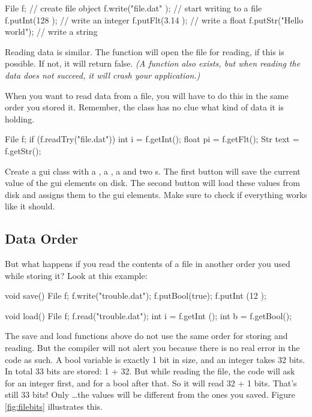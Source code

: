 \begin{code}
File f;                  // create file object
f.write("file.dat"    ); // start writing to a file
f.putInt(128          ); // write an integer
f.putFlt(3.14         ); // write a float
f.putStr("Hello world"); // write a string
\end{code}

Reading data is similar. The function  will open the file for reading, if this is possible. If not, it will return false. \textsl{(A function  also exists, but when reading the data does not succeed, it will crash your application.)}

When you want to read data from a file, you will have to do this in the same order you stored it. Remember, the class  has no clue what kind of data it is holding. 

\begin{code}
File f;
if (f.readTry("file.dat")) {
	int   i    = f.getInt();
	float pi   = f.getFlt();
	Str   text = f.getStr();
}
\end{code}

\begin{exercise}
Create a gui class with a , a , a  and two s. The first button will save the current value of the gui elements on disk. The second button will load these values from disk and assigns them to the gui elements. Make sure to check if everything works like it should.
\end{exercise}

\subsection{Data Order}
But what happens if you read the contents of a file in another order you used while storing it? Look at this example:

\begin{code}
void save() {
  File f;
	f.write("trouble.dat");
	f.putBool(true);
	f.putInt (12  );
}

void load() {
  File f;
	f.read("trouble.dat");
	int i = f.getInt ();
	int b = f.getBool();
}
\end{code}

The save and load functions above do not use the same order for storing and reading. But the compiler will not alert you because there is no real error in the code as such. A bool variable is exactly 1 bit in size, and an integer takes 32 bits. In total 33 bits are stored: 1 + 32. But while reading the file, the code will ask for an integer first, and for a bool after that. So it will read 32 + 1 bits. That's still 33 bits! Only \ldots the values will be different from the ones you saved. Figure \ref{fig:filebits} illustrates this.

